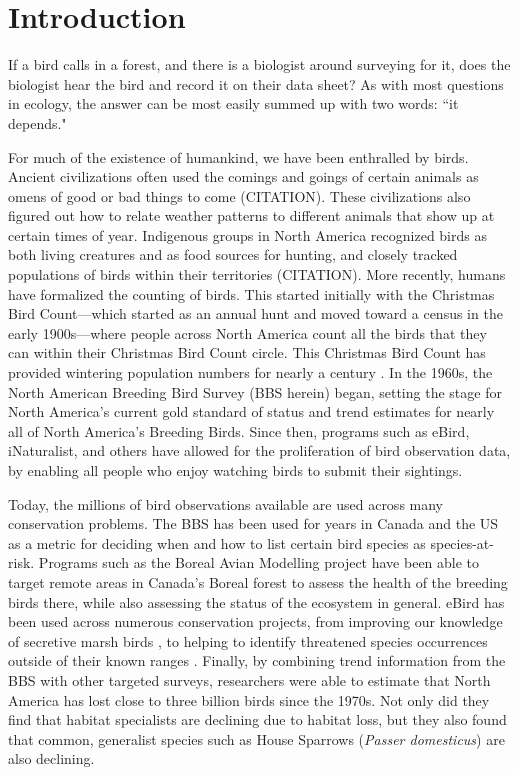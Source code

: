 \chapter{Introduction}

\par If a bird calls in a forest, and there is a biologist around surveying for it, does the biologist hear the bird and record it on their data sheet?
As with most questions in ecology, the answer can be most easily summed up with two words: ``it depends."

\par For much of the existence of humankind, we have been enthralled by birds.
Ancient civilizations often used the comings and goings of certain animals as omens of good or bad things to come (CITATION).
These civilizations also figured out how to relate weather patterns to different animals that show up at certain times of year.
Indigenous groups in North America recognized birds as both living creatures and as food sources for hunting, and closely tracked populations of birds within their territories (CITATION).
More recently, humans have formalized the counting of birds.
This started initially with the Christmas Bird Count---which started as an annual hunt and moved toward a census in the early 1900s---where people across North America count all the birds that they can within their Christmas Bird Count circle.
This Christmas Bird Count has provided wintering population numbers for nearly a century \citep{bock_christmas_1981, niven_christmas_2004, national_audubon_society_audubon_2024}.
In the 1960s, the North American Breeding Bird Survey (BBS herein) began, setting the stage for North America's current gold standard of status and trend estimates for nearly all of North America's Breeding Birds.
Since then, programs such as eBird, iNaturalist, and others have allowed for the proliferation of bird observation data, by enabling all people who enjoy watching birds to submit their sightings.

\par Today, the millions of bird observations available are used across many conservation problems.
The BBS has been used for years in Canada and the US as a metric for deciding when and how to list certain bird species as species-at-risk.
Programs such as the Boreal Avian Modelling project have been able to target remote areas in Canada's Boreal forest to assess the health of the breeding birds there, while also assessing the status of the ecosystem in general.
eBird has been used across numerous conservation projects, from improving our knowledge of secretive marsh birds \citep{bianchini_using_2023}, to helping to identify threatened species occurrences outside of their known ranges \citep{lin_using_2022}.
Finally, by combining trend information from the BBS with other targeted surveys, researchers were able to estimate that North America has lost close to three billion birds since the 1970s.
Not only did they find that habitat specialists are declining due to habitat loss, but they also found that common, generalist species such as House Sparrows (\textit{Passer domesticus}) are also declining.

